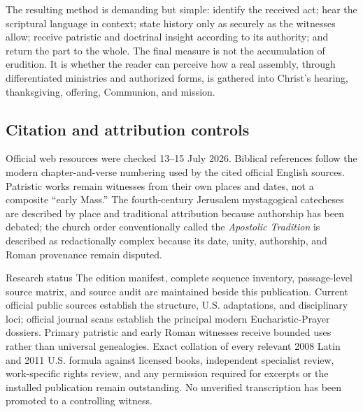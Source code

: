 {The resulting method is demanding but simple: identify the received act; hear the scriptural language in context; state history only as securely as the witnesses allow; receive patristic and doctrinal insight according to its authority; and return the part to the whole. The final measure is not the accumulation of erudition. It is whether the reader can perceive how a real assembly, through differentiated ministries and authorized forms, is gathered into Christ's hearing, thanksgiving, offering, Communion, and mission.

\subsection{Citation and attribution controls}

Official web resources were checked 13--15 July 2026. Biblical references follow the modern chapter-and-verse numbering used by the cited official English sources. Patristic works remain witnesses from their own places and dates, not a composite ``early Mass.'' The fourth-century Jerusalem mystagogical catecheses are described by place and traditional attribution because authorship has been debated; the church order conventionally called the \emph{Apostolic Tradition} is described as redactionally complex because its date, unity, authorship, and Roman provenance remain disputed.

\begin{massbox}{Research status}
The edition manifest, complete sequence inventory, passage-level source matrix, and source audit are maintained beside this publication. Current official public sources establish the structure, U.S. adaptations, and disciplinary loci; official journal scans establish the principal modern Eucharistic-Prayer dossiers. Primary patristic and early Roman witnesses receive bounded uses rather than universal genealogies. Exact collation of every relevant 2008 Latin and 2011 U.S. formula against licensed books, independent specialist review, work-specific rights review, and any permission required for excerpts or the installed publication remain outstanding. No unverified transcription has been promoted to a controlling witness.
\end{massbox}
}
